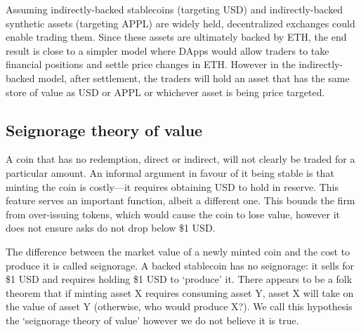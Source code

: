 Assuming indirectly-backed stablecoins (targeting USD) and indirectly-backed synthetic assets (targeting APPL) are widely held, decentralized exchanges could enable trading them. Since these assets are ultimately backed by ETH, the end result is close to a simpler model where DApps would allow traders to take financial positions and settle price changes in ETH. However in the indirectly-backed model, after settlement, the traders will hold an asset that has the same store of value as USD or APPL or whichever asset is being price targeted. 




\subsection{Seignorage theory of value}


 A coin that has no redemption, direct or indirect, will not clearly be traded for a particular amount. An informal argument in favour of it being stable is that minting the coin is costly---it requires obtaining USD to hold in reserve. This feature serves an important function, albeit a different one. This bounds the firm from over-issuing tokens, which would cause the coin to lose value, however it does not ensure asks do not drop below \$1 USD.

The difference between the market value of a newly minted coin and the cost to produce it is called seignorage. A backed stablecoin has no seignorage: it sells for \$1 USD and requires holding \$1 USD to `produce' it. There appears to be a folk theorem that if minting asset X requires consuming asset Y, asset X will take on the value of asset Y (otherwise, who would produce X?). We call this hypothesis the `seignorage theory of value' however we do not believe it is true. 

